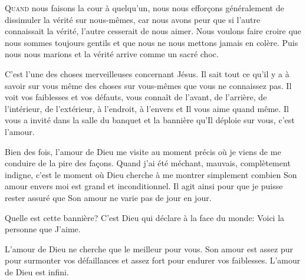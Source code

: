 \lettrine{Q}{uand} nous faisons la cour à quelqu'un,
 nous nous effor\c{c}ons généralement de dissimuler la vérité sur nous-mêmes,
 car nous avons peur que si l'autre connaissait la vérité,
 l'autre cesserait de nous aimer.
 Nous voulons faire croire que nous sommes toujours gentils
 et que nous ne nous mettons jamais en colère.
 Puis nous nous marions et la vérité arrive comme un sacré choc. 

C'est l'une des choses merveilleuses concernant Jésus.
 Il sait tout ce qu'il y a à savoir sur vous
 \ocadr même des choses sur vous-mêmes que vous ne connaissez pas.
 Il voit vos faiblesses et vos défauts, vous connaît de l'avant,
 de l'arrière, de l'intérieur, de l'extérieur, à l'endroit,
 à l'envers et Il vous aime quand même.
 Il vous a invité dans la salle du banquet et la bannière
 qu'Il déploie sur vous, c'est l'amour.

Bien des fois, l'amour de Dieu me visite au moment précis
 où je viens de me conduire de la pire des fa\c{c}ons.
 Quand j'ai été méchant, mauvais, complètement indigne,
 c'est le moment où Dieu cherche à me montrer simplement
 combien Son amour envers moi est grand et inconditionnel.
 Il agit ainsi pour que je puisse rester assuré que Son amour
 ne varie pas de jour en jour. 

Quelle est cette bannière?
 C'est Dieu qui déclare à la face du monde: 
 \Og Voici la personne que J'aime. \Fg{}



L'amour de Dieu ne cherche que le meilleur pour vous.
 Son amour est assez pur pour surmonter vos défaillances
 et assez fort pour endurer vos faiblesses.
 L'amour de Dieu est infini. 

\dvrule






